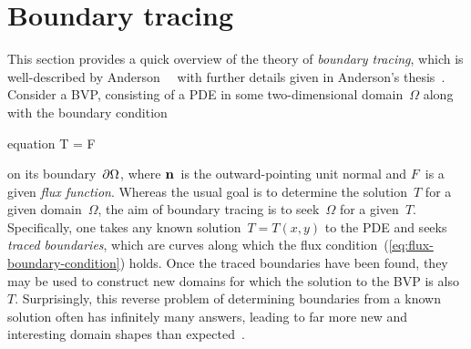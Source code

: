 \section{Boundary tracing}
\label{sec:introduction.tracing}

This section provides a quick overview of
the theory of \emph{boundary tracing},
which is well-described by
Anderson~\etal~\cite{anderson-2007-boundary-tracing-i-theory}
with further details given in
Anderson's thesis~\cite{anderson-2002-thesis-boundary-tracing-pdes}.
Consider a BVP\@, consisting of
a PDE in some two-dimensional domain~$\Omega$
along with the boundary condition
\begin{important}{equation}
  \normalvec \dotp \del T = F 
  \label{eq:flux-boundary-condition}
\end{important}
on its boundary~$\mathop{}\!\partial\Omega$,
where $\mathop{}\!\boldsymbol{\mathrm{n}}$~is the outward-pointing unit normal
and $F$~is a given \emph{flux function}.
Whereas the usual goal is
to determine the solution~$T$ for a given domain~$\Omega$,
the aim of boundary tracing is
to seek~$\Omega$ for a given~$T$.
Specifically, one takes any known solution~$T = T (x, y)$ to the PDE
and seeks \emph{traced boundaries}, which are curves
along which the flux condition~(\ref{eq:flux-boundary-condition}) holds.
Once the traced boundaries have been found,
they may be used to construct new domains
for which the solution to the BVP is also~$T$.
Surprisingly, this reverse problem
of determining boundaries from a known solution
often has infinitely many answers,
leading to far more new and interesting domain shapes
than expected~\cite{anderson-2007-boundary-tracing-ii-applications}.


